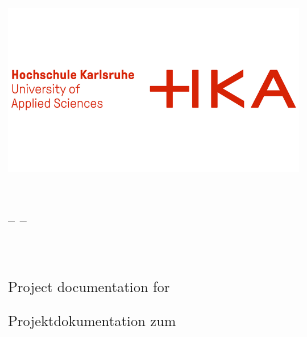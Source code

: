 \thispagestyle{empty}

\begin{titlepage}
	
	\vspace*{-2,5cm}
  	\begin{center}
    		\includegraphics[width=7.7cm]{Figures/png/HKA_Logo.png} \\ 
  	\end{center}

  	\begin{center}
		\vspace{0.1cm}
		\LARGE \textbf{\University}\\
		\vspace{0.4cm}
		\Large -- \Faculty --
	\end{center}
	
	\vfill
	
	\begin{center}
		\huge \textbf{\ThesisTitle}\\
		\vspace{0.4cm}
		\LARGE \ThesisSubtitle
	\end{center}
	
	\vfill
	
	\ifdefined\ThesisLanguageIsEnglish
		\begin{center}
			\Large Project documentation for\\
			\vspace{0.3cm}
			\Large \Subject
		\end{center}
	\else
		\begin{center}
			\Large Projektdokumentation zum\\
			\vspace{0.3cm}
			\Large \Subject   %
		\end{center}
	\fi
	

\end{titlepage}
